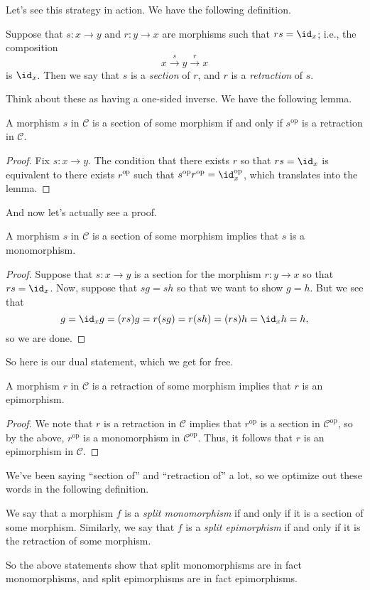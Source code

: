 \documentclass[../notes.tex]{subfiles}
\begin{document}
Let's see this strategy in action. We have the following definition.
\begin{definition}
	Suppose that $s:x\to y$ and $r:y\to x$ are morphisms such that $rs=\id_x$; i.e., the composition
	\[x\stackrel s\to y\stackrel r\to x\]
	is $\id_x$. Then we say that $s$ is a \textit{section} of $r$, and $r$ is a \textit{retraction} of $s$.
\end{definition}
Think about these as having a one-sided inverse. We have the following lemma.
\begin{lemma}
	A morphism $s$ in $\mathcal C$ is a section of some morphism if and only if $s^\mathrm{op}$ is a retraction in $\mathcal C$.
\end{lemma}
\begin{proof}
	Fix $s:x\to y$. The condition that there exists $r$ so that $rs=\id_x$ is equivalent to there exists $r^\mathrm{op}$ such that $s^\mathrm{op}r^\mathrm{op}=\id_x^\mathrm{op}$, which translates into the lemma.
\end{proof}
And now let's actually see a proof.
\begin{proposition}
	A morphism $s$ in $\mathcal C$ is a section of some morphism implies that $s$ is a monomorphism.
\end{proposition}
\begin{proof}
	Suppose that $s:x\to y$ is a section for the morphism $r:y\to x$ so that $rs=\id_x$. Now, suppose that $sg=sh$ so that we want to show $g=h$. But we see that
	\[g=\id_xg=(rs)g=r(sg)=r(sh)=(rs)h=\id_xh=h,\]
	so we are done.
\end{proof}
So here is our dual statement, which we get for free.
\begin{proposition}
	A morphism $r$ in $\mathcal C$ is a retraction of some morphism implies that $r$ is an epimorphism.
\end{proposition}
\begin{proof}
	We note that $r$ is a retraction in $\mathcal C$ implies that $r^\mathrm{op}$ is a section in $\mathcal C^\mathrm{op}$, so by the above, $r^\mathrm{op}$ is a monomorphism in $\mathcal C^\mathrm{op}$. Thus, it follows that $r$ is an epimorphism in $\mathcal C$.
\end{proof}
We've been saying ``section of'' and ``retraction of'' a lot, so we optimize out these words in the following definition.
\begin{definition}
	We say that a morphism $f$ is a \textit{split monomorphism} if and only if it is a section of some morphism. Similarly, we say that $f$ is a \textit{split epimorphism} if and only if it is the retraction of some morphism.
\end{definition}
So the above statements show that split monomorphisms are in fact monomorphisms, and split epimorphisms are in fact epimorphisms.
\end{document}
